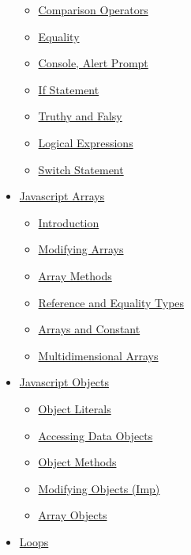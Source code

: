 \documentclass[
  paper=a4,
  ,captions=tableheading
]{scrartcl}
\providecommand{\tightlist}{%
  \setlength{\itemsep}{0pt}\setlength{\parskip}{0pt}}
\begin{document}
\begin{itemize}
  \begin{itemize}
  \tightlist
  \item
    \protect\hyperlink{comparison-operators}{Comparison Operators}
  \item
    \protect\hyperlink{equality}{Equality}
  \item
    \protect\hyperlink{console-alert-prompt}{Console, Alert Prompt}
  \item
    \protect\hyperlink{if-statement}{If Statement}
  \item
    \protect\hyperlink{truthy-and-falsy}{Truthy and Falsy}
  \item
    \protect\hyperlink{logical-expressions}{Logical Expressions}
  \item
    \protect\hyperlink{switch-statement}{Switch Statement}
  \end{itemize}
\item
  \protect\hyperlink{javascript-arrays}{Javascript Arrays}

  \begin{itemize}
  \tightlist
  \item
    \protect\hyperlink{introduction}{Introduction}
  \item
    \protect\hyperlink{modifying-arrays}{Modifying Arrays}
  \item
    \protect\hyperlink{array-methods}{Array Methods}
  \item
    \protect\hyperlink{reference-and-equality-types}{Reference and
    Equality Types}
  \item
    \protect\hyperlink{arrays-and-constant}{Arrays and Constant}
  \item
    \protect\hyperlink{multidimensional-arrays}{Multidimensional Arrays}
  \end{itemize}
\item
  \protect\hyperlink{javascript-objects}{Javascript Objects}

  \begin{itemize}
  \tightlist
  \item
    \protect\hyperlink{object-literals}{Object Literals}
  \item
    \protect\hyperlink{accessing-data-objects}{Accessing Data Objects}
  \item
    \protect\hyperlink{object-methods}{Object Methods}
  \item
    \protect\hyperlink{modifying-objects-imp}{Modifying Objects (Imp)}
  \item
    \protect\hyperlink{array-objects}{Array Objects}
  \end{itemize}
\item
  \protect\hyperlink{loops}{Loops}


\end{itemize}
\end{document}
